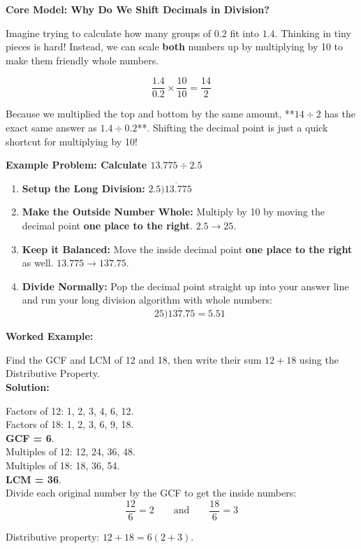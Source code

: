 \documentclass[12pt, letterpaper, fleqn]{article}
\begin{document}
\begin{tcolorbox}[colback=white, colframe=black!25, boxrule=0.6pt, arc=4mm, left=6mm, right=6mm, top=4mm, bottom=4mm]
\textbf{Core Model: Why Do We Shift Decimals in Division?}

\medskip
Imagine trying to calculate how many groups of $0.2$ fit into $1.4$. Thinking in tiny pieces is hard! Instead, we can scale \textbf{both} numbers up by multiplying by 10 to make them friendly whole numbers. 

$$\frac{1.4}{0.2} \times \frac{10}{10} = \frac{14}{2}$$

Because we multiplied the top and bottom by the same amount, **$14 \div 2$ has the exact same answer as $1.4 \div 0.2$**. Shifting the decimal point is just a quick shortcut for multiplying by 10!

\medskip
\textbf{Example Problem: Calculate $13.775 \div 2.5$}

\begin{enumerate}[itemsep=4pt]
    \item \textbf{Setup the Long Division:} $2.5 \overline{)13.775}$
    \item \textbf{Make the Outside Number Whole:} Multiply by 10 by moving the decimal point \textbf{one place to the right}. $2.5 \rightarrow 25$.
    \item \textbf{Keep it Balanced:} Move the inside decimal point \textbf{one place to the right} as well. $13.775 \rightarrow 137.75$.
    \item \textbf{Divide Normally:} Pop the decimal point straight up into your answer line and run your long division algorithm with whole numbers:
    $$25 \overline{)137.75} = \mathbf{5.51}$$
\end{enumerate}
\end{tcolorbox}

\vspace{4mm}

\begin{tcolorbox}[colback=white, colframe=black!25, boxrule=0.6pt, arc=4mm, left=6mm, right=6mm, top=5mm, bottom=5mm]

\textbf{Worked Example:}

\vspace{0.2cm}

\medskip
\noindent
Find the GCF and LCM of 12 and 18, then write their sum $12 + 18$ using the Distributive Property.\\ 


\textbf{Solution:} 

Factors of 12: 1, 2, 3, 4, 6, 12. \\ Factors of 18: 1, 2, 3, 6, 9, 18. \\ \textbf{GCF = 6}.\\ 
Multiples of 12: 12, 24, 36, 48. \\ Multiples of 18: 18, 36, 54. \\ \textbf{LCM = 36}.\\ 

Divide each original number by the GCF to get the inside numbers:
    $$\frac{12}{6} = 2 \qquad \text{and} \qquad \frac{18}{6} = 3$$

Distributive property: $12 + 18 = 6(2 + 3)$.
\end{tcolorbox}
\end{document}
